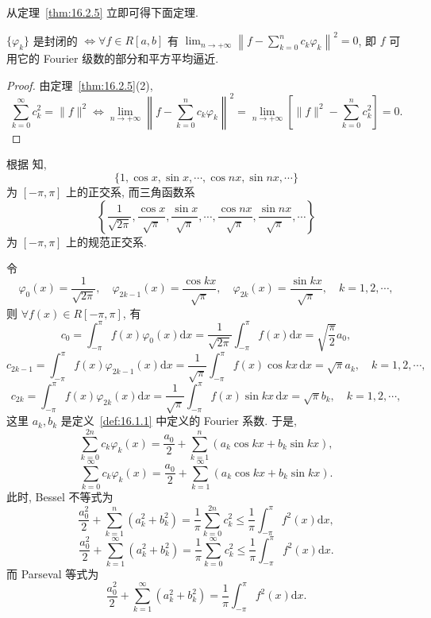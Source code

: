 从定理~\ref{thm:16.2.5} 立即可得下面定理.

\begin{theorem}\label{thm:16.2.6}
$\{\varphi_{k}\}$ 是封闭的 $\iff \forall f \in R[a,b]$ 有 $\lim_{n\to+\infty}\left\|f - \sum_{k=0}^{n}c_{k}\varphi_{k}\right\|^{2} = 0$, 即 $f$ 可用它的 Fourier 级数的部分和平方平均逼近.
\end{theorem}

\begin{proof}
由定理~\ref{thm:16.2.5}(2),
\[
  \sum_{k=0}^{\infty}c_{k}^{2}=\|f\|^{2}\iff\lim_{n\to+\infty}\left\|f-\sum_{k=0}^{n}c_{k}\varphi_{k}\right\|^{2}=\lim_{n\to+\infty}\left[\|f\|^{2}-\sum_{k=0}^{n}c_{k}^{2}\right]=0.
\]
\end{proof}

\begin{example}\label{ex:16.2.1}
根据 知,
\[
  \{1,\cos x,\sin x,\cdots,\cos nx,\sin nx,\cdots\}
\]
为 $[-\pi, \pi]$ 上的正交系, 而三角函数系
\[
  \left\{\frac{1}{\sqrt{2\pi}},\frac{\cos x}{\sqrt{\pi}},\frac{\sin x}{\sqrt{\pi}},\cdots,\frac{\cos nx}{\sqrt{\pi}},\frac{\sin nx}{\sqrt{\pi}},\cdots\right\}
\]
为 $[-\pi,\pi]$ 上的规范正交系.

令
\[
  \varphi_{0}(x)=\frac{1}{\sqrt{2\pi}},\quad\varphi_{2k-1}(x)=\frac{\cos k x}{\sqrt{\pi}},\quad\varphi_{2k}(x)=\frac{\sin k x}{\sqrt{\pi}},\quad k=1,2,\cdots,
\]
则 $\forall f(x) \in R[-\pi, \pi]$, 有
\[
  c_{0}=\int_{-\pi}^{\pi}f(x)\varphi_{0}(x)\mathrm{d}x=\frac{1}{\sqrt{2\pi}}\int_{-\pi}^{\pi}f(x)\mathrm{d}x=\sqrt{\frac{\pi}{2}}a_{0},
\]
\[
  c_{2k-1}=\int_{-\pi}^{\pi}f(x)\varphi_{2k-1}(x)\mathrm{d}x=\frac{1}{\sqrt{\pi}}\int_{-\pi}^{\pi}f(x)\cos kx\,\mathrm{d}x=\sqrt{\pi}a_{k},\quad k=1,2,\cdots,
\]
\[
  c_{2k}=\int_{-\pi}^{\pi}f(x)\varphi_{2k}(x)\mathrm{d}x=\frac{1}{\sqrt{\pi}}\int_{-\pi}^{\pi}f(x)\sin k x\,\mathrm{d}x=\sqrt{\pi}b_{k},\quad k=1,2,\cdots,
\]
这里 $a_{k}, b_{k}$ 是定义~\ref{def:16.1.1} 中定义的 Fourier 系数. 于是,
\[
  \sum_{k=0}^{2n}c_{k}\varphi_{k}(x)=\frac{a_{0}}{2}+\sum_{k=1}^{n}\left(a_{k}\cos kx+b_{k}\sin kx\right),
\]
\[
  \sum_{k=0}^{\infty}c_{k}\varphi_{k}(x)=\frac{a_{0}}{2}+\sum_{k=1}^{\infty}\left(a_{k}\cos k x+b_{k}\sin k x\right).
\]
此时, Bessel 不等式为
\[
  \frac{a_{0}^{2}}{2}+\sum_{k=1}^{n}(a_{k}^{2}+b_{k}^{2})=\frac{1}{\pi}\sum_{k=0}^{2n}c_{k}^{2}\leqslant\frac{1}{\pi}\int_{-\pi}^{\pi}f^{2}(x)\mathrm{d}x,
\]
\[
  \frac{a_{0}^{2}}{2}+\sum_{k=1}^{\infty}(a_{k}^{2}+b_{k}^{2})=\frac{1}{\pi}\sum_{k=0}^{\infty}c_{k}^{2}\leqslant\frac{1}{\pi}\int_{-\pi}^{\pi}f^{2}(x)\mathrm{d}x.
\]
而 Parseval 等式为
\[
  \frac{a_{0}^{2}}{2}+\sum_{k=1}^{\infty}(a_{k}^{2}+b_{k}^{2})=\frac{1}{\pi}\int_{-\pi}^{\pi}f^{2}(x)\mathrm{d}x.
\]
\end{example}

